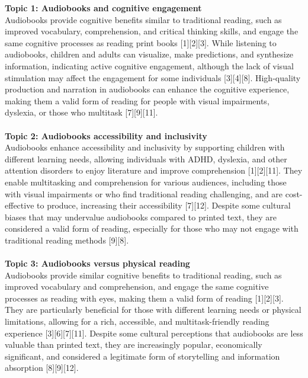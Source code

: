 \hypersetup{
    colorlinks=true, %
    linkcolor=black, %
    citecolor=black, %
    urlcolor=black %
}

\begin{summary}[title={\modelTopic Summary: Are Audiobooks Considered Real Reading? (ConflictingQA)}, label=summary1]
\textbf{Topic 1: Audiobooks and cognitive engagement}\\
Audiobooks provide cognitive benefits similar to traditional reading, such as improved vocabulary, comprehension, and critical thinking skills, and engage the same cognitive processes as reading print books [1][2][3]. While listening to audiobooks, children and adults can visualize, make predictions, and synthesize information, indicating active cognitive engagement, although the lack of visual stimulation may affect the engagement for some individuals [3][4][8]. High-quality production and narration in audiobooks can enhance the cognitive experience, making them a valid form of reading for people with visual impairments, dyslexia, or those who multitask [7][9][11].\\
\\
\textbf{Topic 2: Audiobooks accessibility and inclusivity}\\
Audiobooks enhance accessibility and inclusivity by supporting children with different learning needs, allowing individuals with ADHD, dyslexia, and other attention disorders to enjoy literature and improve comprehension [1][2][11]. They enable multitasking and comprehension for various audiences, including those with visual impairments or who find traditional reading challenging, and are cost-effective to produce, increasing their accessibility [7][12]. Despite some cultural biases that may undervalue audiobooks compared to printed text, they are considered a valid form of reading, especially for those who may not engage with traditional reading methods [9][8].\\
\\
\textbf{Topic 3: Audiobooks versus physical reading}\\
Audiobooks provide similar cognitive benefits to traditional reading, such as improved vocabulary and comprehension, and engage the same cognitive processes as reading with eyes, making them a valid form of reading [1][2][3]. They are particularly beneficial for those with different learning needs or physical limitations, allowing for a rich, accessible, and multitask-friendly reading experience [3][6][7][11]. Despite some cultural perceptions that audiobooks are less valuable than printed text, they are increasingly popular, economically significant, and considered a legitimate form of storytelling and information absorption [8][9][12].
\end{summary}

